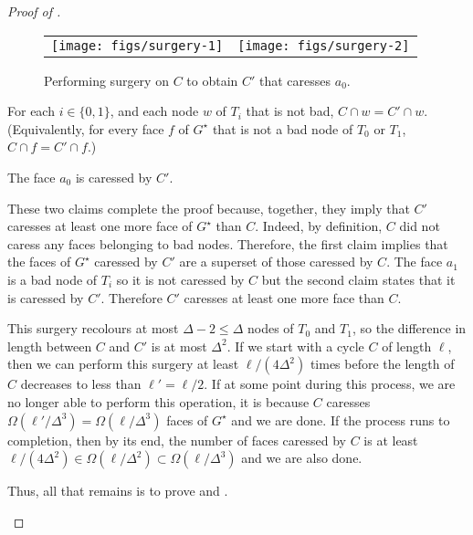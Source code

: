 \documentclass{patmorin}
\newcommand{\dual}[1]{{#1}^\star}
\begin{document}
\begin{proof}[Proof of ]
\begin{enumerate}
   \begin{figure}
     \begin{center}
       \begin{tabular}{cc}
         \texttt{[image: figs/surgery-1]} &
         \texttt{[image: figs/surgery-2]}
       \end{tabular}
     \end{center}
     \caption{Performing surgery on $C$ to obtain $C'$ that caresses $a_0$.}
   \end{figure}

   \begin{clm}
      For each $i\in\{0,1\}$, and each node $w$ of $T_i$ that is not bad,
      $C\cap w=C'\cap w$.  (Equivalently, for every face $f$ of $\dual{G}$
      that is not a bad node of $T_0$ or $T_1$, $C\cap f=C'\cap f$.)
   \end{clm}

   \begin{clm}
      The face $a_0$ is caressed by $C'$.
   \end{clm}

   These two claims complete the proof because, together, they imply that $C'$ caresses at least one more face of $\dual{G}$ than $C$.  Indeed, by definition, $C$ did not caress any faces belonging to bad nodes. Therefore, the first claim implies that the faces of $\dual{G}$ caressed by $C'$ are a superset of those caressed by $C$.  The face $a_1$ is a bad node of $T_i$ so it is not caressed by $C$ but the second claim states that it is caressed by $C'$.  Therefore $C'$ caresses at least one more face than $C$.

   This surgery recolours at most $\Delta-2\le \Delta$ nodes of $T_0$
   and $T_1$, so the difference in length between $C$ and $C'$
   is at most $\Delta^2$.  If we start with a cycle $C$
   of length $\ell$, then we can perform this surgery at least
   $\ell/(4\Delta^2)$ times before the length of $C$ decreases
   to less than $\ell'=\ell/2$. If at some point during this process,
   we are no longer able to perform this operation, it is because
   $C$ caresses $\Omega(\ell'/\Delta^3)=\Omega(\ell/\Delta^3)$
   faces of $\dual{G}$ and we are done.  If the process runs to completion, then by its end, the number of faces caressed by $C$ is at least
   $\ell/(4\Delta^2)\in\Omega(\ell/\Delta^2)\subset\Omega(\ell/\Delta^3)$
   and we are also done.

   Thus, all that remains is to prove  and
   .


\end{enumerate}
\end{proof}
\end{document}
